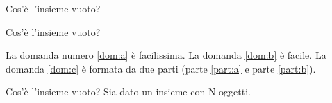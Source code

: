 \documentclass[12pt]{exam}
\begin{document}
\bracketedpoints
\begin{questions}
\question[1]
Cos’è l’insieme vuoto?
\end{questions}

\begin{questions}
\question[25]
Cos’è l’insieme vuoto?
\end{questions}
La domanda numero \ref{dom:a} è
facilissima. La domanda
\ref{dom:b} è facile.
La domanda \ref{dom:c} è formata
da due parti (parte \ref{part:a}
e parte \ref{part:b}).
\begin{questions}
\question[1]
\label{dom:a}
Cos’è l’insieme vuoto?
\question[4]
\label{dom:b}
Sia dato un insieme con N oggetti.
\question
\label{dom:c}
\end{questions}
\end{document}

